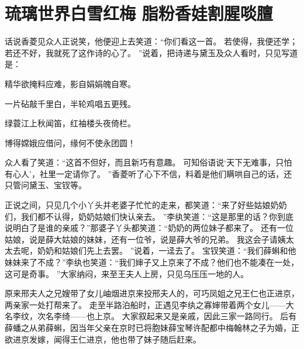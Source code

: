\chapter{琉璃世界白雪红梅 \quad 脂粉香娃割腥啖膻}
\par
{}\par
话说香菱见众人正说笑，他便迎上去笑道：“你们看这一首。
若使得，我便还学；若还不好，我就死了这作诗的心了。
”说着，把诗递与黛玉及众人看时，只见写道是：\par
\hop
精华欲掩料应难，影自娟娟魄自寒。
\par
一片砧敲千里白，半轮鸡唱五更残。
\par
绿蓑江上秋闻笛，红袖楼头夜倚栏。
\par
博得嫦娥应借问，缘何不使永团圆！\par
\hop
众人看了笑道：“这首不但好，而且新巧有意趣。
可知俗语说‘天下无难事，只怕有心人’，社里一定请你了。
”香菱听了心下不信，料着是他们瞒哄自己的话，还只管问黛玉、宝钗等。
\par
正说之间，只见几个小丫头并老婆子忙忙的走来，都笑道：“来了好些姑娘奶奶们，我们都不认得，奶奶姑娘们快认亲去。
”李纨笑道：“这是那里的话？你到底说明白了是谁的亲戚？”那婆子丫头都笑道：“奶奶的两位妹子都来了。
还有一位姑娘，说是薛大姑娘的妹妹，还有一位爷，说是薛大爷的兄弟。
我这会子请姨太太去呢，奶奶和姑娘们先上去罢。
”说着，一迳去了。
宝钗笑道：“我们薛蝌和他妹妹来了不成？”李纨也笑道：“我们婶子又上京来了不成？他们也不能凑在一处，这可是奇事。
”大家纳闷，来至王夫人上房，只见乌压压一地的人。
\par
原来邢夫人之兄嫂带了女儿岫烟进京来投邢夫人的，可巧凤姐之兄王仁也正进京，两亲家一处打帮来了。
走至半路泊船时，正遇见李纨之寡婶带着两个女儿——大名李纹，次名李绮——也上京。
大家叙起来又是亲戚，因此三家一路同行。
后有薛蟠之从弟薛蝌，因当年父亲在京时已将胞妹薛宝琴许配都中梅翰林之子为婚，正欲进京发嫁，闻得王仁进京，他也带了妹子随后赶来。
